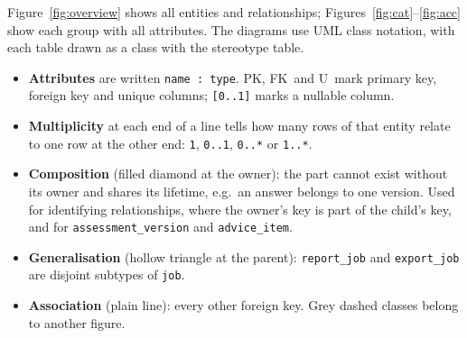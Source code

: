 \documentclass[11pt,a4paper]{article}
\newcommand{\tb}[1]{\texttt{#1}}
\begin{document}
Figure~\ref{fig:overview} shows all entities and relationships; Figures~\ref{fig:cat}--\ref{fig:acc} show each group with all attributes. The diagrams use UML class notation, with each table drawn as a class with the stereotype \guillemotleft table\guillemotright.
\begin{itemize}
\item \textbf{Attributes} are written \tb{name : type}. \guillemotleft PK\guillemotright, \guillemotleft FK\guillemotright\ and \guillemotleft U\guillemotright\ mark primary key, foreign key and unique columns; \tb{[0..1]} marks a nullable column.
\item \textbf{Multiplicity} at each end of a line tells how many rows of that entity relate to one row at the other end: \tb{1}, \tb{0..1}, \tb{0..*} or \tb{1..*}.
\item \textbf{Composition} (filled diamond at the owner): the part cannot exist without its owner and shares its lifetime, e.g.\ an answer belongs to one version. Used for identifying relationships, where the owner's key is part of the child's key, and for \tb{assessment\_version} and \tb{advice\_item}.
\item \textbf{Generalisation} (hollow triangle at the parent): \tb{report\_job} and \tb{export\_job} are disjoint subtypes of \tb{job}.
\item \textbf{Association} (plain line): every other foreign key. Grey dashed classes belong to another figure.
\end{itemize}
\end{document}
